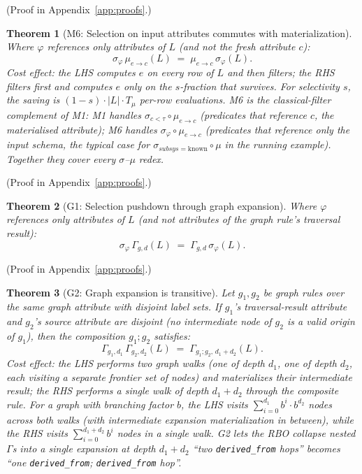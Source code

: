 \documentclass[sigconf]{acmart}
\theoremstyle{plain}
\newtheorem{theorem}{Theorem}
\theoremstyle{definition}
\theoremstyle{remark}
\begin{document}
  (Proof in Appendix~\ref{app:proofs}.)

\begin{theorem}[M6: Selection on input attributes commutes with materialization]\label{thm:m6}
Where $\varphi$ references only attributes of $L$ (and not the
fresh attribute $c$):
\[
\sigma_\varphi\, \mu_{e \to c}(L)
\;=\;
\mu_{e \to c}\, \sigma_\varphi(L).
\]
\emph{Cost effect:} the LHS computes $e$ on every row of $L$ and
then filters; the RHS filters first and computes $e$ only on the
$s$-fraction that survives. For selectivity $s$, the saving is
$(1-s) \cdot |L| \cdot T_\mu$ per-row evaluations. M6 is the
classical-filter complement of M1: M1 handles
$\sigma_{c<\tau} \circ \mu_{e \to c}$ (predicates that reference
$c$, the materialised attribute); M6 handles
$\sigma_\varphi \circ \mu_{e \to c}$ (predicates that reference
only the input schema, the typical case for
$\sigma_{\mathit{subsys}=\mathrm{known}} \circ \mu$ in the running
example). Together they cover every $\sigma$--$\mu$ redex.
\end{theorem}

  (Proof in Appendix~\ref{app:proofs}.)

\begin{theorem}[G1: Selection pushdown through graph expansion]\label{thm:g1}
Where $\varphi$ references only attributes of $L$ (and not
attributes of the graph rule's traversal result):
\[
\sigma_\varphi\, \Gamma_{g, d}(L) \;=\; \Gamma_{g, d}\, \sigma_\varphi(L).
\]
\end{theorem}

  (Proof in Appendix~\ref{app:proofs}.)

\begin{theorem}[G2: Graph expansion is transitive]\label{thm:g2}
Let $g_1, g_2$ be graph rules over the same graph attribute
with disjoint label sets. If $g_1$'s traversal-result
attribute and $g_2$'s source attribute are disjoint (no
intermediate node of $g_2$ is a valid origin of $g_1$),
then the composition $g_1; g_2$ satisfies:
\[
\Gamma_{g_1, d_1}\, \Gamma_{g_2, d_2}(L) \;=\;
\Gamma_{g_1;g_2,\, d_1+d_2}(L).
\]
\emph{Cost effect:} the LHS performs two graph walks (one of
depth $d_1$, one of depth $d_2$, each visiting a separate
frontier set of nodes) and materializes their intermediate
result; the RHS performs a single walk of depth $d_1 + d_2$
through the composite rule. For a graph with branching factor
$b$, the LHS visits $\sum_{i=0}^{d_1} b^i \cdot b^{d_2}$ nodes
across both walks (with intermediate expansion materialization
in between), while the RHS visits $\sum_{i=0}^{d_1+d_2} b^i$ nodes
in a single walk. G2 lets the RBO collapse nested
$\Gamma$s into a single expansion at depth $d_1 + d_2$
``two \texttt{derived\_from} hops'' becomes ``one
\texttt{derived\_from}; \texttt{derived\_from} hop''.
\end{theorem}
\end{document}
